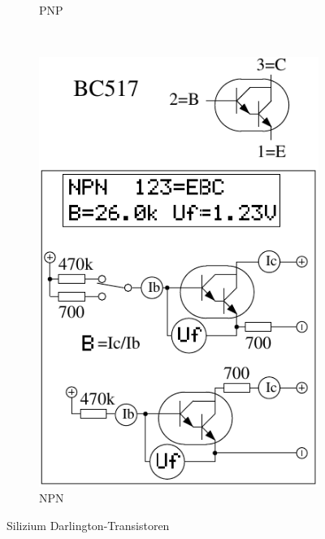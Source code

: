 \begin{figure}[H]
\begin{subfigure}[b]{.5\textwidth}
    \caption{PNP}
    \label{fig:BJT-PNP-Darl}
  \end{subfigure}
  ~
  \begin{subfigure}[b]{.5\textwidth}
    \centering
    \includegraphics[width=1.\textwidth]{../FIG/BJT_BC517.pdf}
    \caption{NPN}
    \label{fig:BJT-NPN-Darl}
  \end{subfigure}
  \caption{Silizium Darlington-Transistoren}
\end{figure}

